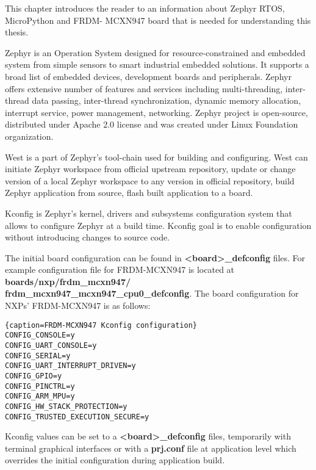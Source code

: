 \documentclass[twoside, 12pt]{article}
\begin{document}
This chapter introduces the reader to an information about Zephyr RTOS, MicroPython and FRDM-
MCXN947 board that is needed for understanding this thesis.

Zephyr is an Operation System designed for resource-constrained and embedded 
system from simple sensors to smart industrial embedded solutions. It supports a broad list 
of embedded devices, development boards and peripherals. Zephyr offers extensive number of 
features and services including multi-threading, inter-thread data passing, inter-thread 
synchronization, dynamic memory allocation, interrupt service, power management, networking.
Zephyr project is open-source, distributed under Apache 2.0 license and was created under 
Linux Foundation organization.\cite{zephyr1}

West is a part of Zephyr's tool-chain used for building and configuring. West can initiate
Zephyr workspace from official upstream repository, update or change version of a local
Zephyr workspace to any version in official repository, build Zephyr application from source,
flash built application to a board.\cite{zephyr_west}

Kconfig is Zephyr's kernel, drivers and subsystems configuration system that allows to configure Zephyr at a build time. Kconfig goal is to enable configuration without introducing changes to source
code.

The initial board configuration can be found in \textbf{<board>\_defconfig} files. For
example configuration file for FRDM-MCXN947 is located at \textbf{boards/nxp/frdm\_mcxn947/
frdm\_mcxn947\_mcxn947\_cpu0\_defconfig}. The board configuration for NXPs' FRDM-MCXN947
is as follows:
\begin{lstlisting}{caption=FRDM-MCXN947 Kconfig configuration}
CONFIG_CONSOLE=y
CONFIG_UART_CONSOLE=y
CONFIG_SERIAL=y
CONFIG_UART_INTERRUPT_DRIVEN=y
CONFIG_GPIO=y
CONFIG_PINCTRL=y
CONFIG_ARM_MPU=y
CONFIG_HW_STACK_PROTECTION=y
CONFIG_TRUSTED_EXECUTION_SECURE=y
\end{lstlisting}

Kconfig values can be set to a \textbf{<board>\_defconfig} files, temporarily with terminal
graphical interfaces or with a \textbf{prj.conf} file at application level which overrides
the initial configuration during application build.\cite{zephyr_kconfig}
\end{document}
